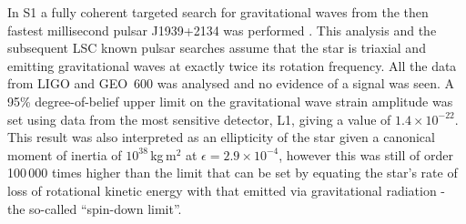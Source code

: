 \documentclass{article}
\begin{document}
In S1 a fully coherent targeted search for gravitational waves from the then
fastest millisecond pulsar J1939+2134 was performed \cite{Abbott:2004d}. This
analysis and the subsequent LSC known pulsar searches assume that the star is
triaxial and emitting gravitational waves at exactly twice its rotation
frequency. All the data from LIGO and GEO~600 was analysed and no evidence of a
signal was seen. A 95\% degree-of-belief upper limit on the gravitational wave
strain amplitude was set using data from the most sensitive detector, L1, giving a
value of $1.4\times10^{-22}$. This result was also interpreted as an ellipticity
of the star given a canonical moment of inertia of $10^{38}$\,kg\,m$^2$ at
$\epsilon = 2.9\times10^{-4}$, however this was still of order 100\,000 times
higher than the limit that can be set by equating the star's rate of loss
of rotational kinetic energy with that emitted via gravitational radiation - the
so-called ``spin-down limit''.
\end{document}
